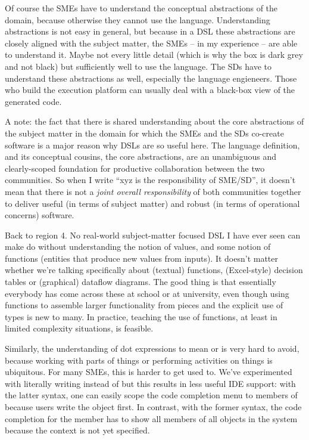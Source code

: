 \documentclass[runningheads]{llncs}
\newcommand{\ic}[1]{\changefont{cmtt}{m}{n}{#1}\normalfont}  %
\newcommand{\changefont}[3]{\fontfamily{#1}\fontseries{#2}\fontshape{#3}\selectfont}
\begin{document}
Of course the SMEs have to understand the conceptual abstractions of the domain,
because otherwise they cannot use the language.
Understanding abstractions is not easy in general, but because in a DSL these
abstractions are closely aligned with the subject matter, the SMEs -- in my
experience -- are able to understand it. Maybe not every little detail (which is
why the box is dark grey and not black) but sufficiently well to use the
language. The SDs have to understand these abstractions as well, especially the
language engieneers. Those who build the execution platform can usually deal
with a black-box view of the generated code.

A note: the fact that there is shared understanding about the core abstractions
of the subject matter in the domain for which the SMEs and the SDs co-create
software is a major reason why DSLs are so useful here. The language definition,
and its conceptual cousins, the core abstractions, are an unambiguous and
clearly-scoped foundation for productive collaboration between the two
communities. So when I write ``xyz is the responsibility of SME/SD'', it doesn't
mean that there is not a \emph{joint overall responsibility} of both communities
together to deliver useful (in terms of subject matter) and robust (in terms of
operational concerns) software.

Back to region 4. No real-world subject-matter focused DSL I have ever seen can
make do without understanding the notion of values, and some notion of functions
(entities that produce new values from inputs). It doesn't matter whether we're
talking specifically about (textual) functions, (Excel-style) decision tables or
(graphical) dataflow diagrams. The good thing is that essentially everybody has
come across these at school or at university, even
though using functions to assemble larger functionality from pieces and the explicit
use of types is new to many. In practice, teaching the use of functions, at least
in limited complexity situations, is feasible. 

Similarly, the understanding of dot expressions to mean \ic{the member X of
entity Y} or \ic{do Z with entity Y} is very hard to avoid, because working with
parts of things or performing activities on things is ubiquitous. For many SMEs,
this is harder to get used to. We've experimented with literally writing
\ic{<member> of <object>} instead of \ic{<object>.<member>} but this results in
less useful IDE support: with the latter syntax, one can easily scope the code
completion menu to members of \ic{object} because users write the object first.
In contrast, with the former syntax, the code completion for the member has to
show all members of all objects in the system because the context \ic{object} is
not yet specified.
\end{document}
